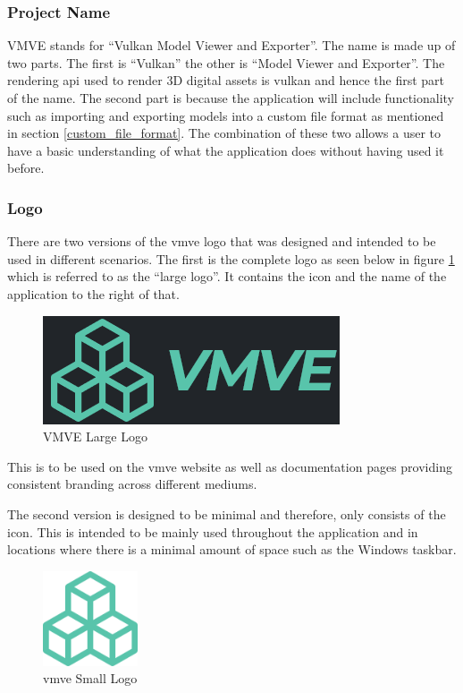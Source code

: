 \documentclass[11pt]{article}
\begin{document}
\subsubsection{Project Name}
VMVE stands for ``Vulkan Model Viewer and Exporter''. The name is made up of
two parts. The first is ``Vulkan'' the other is ``Model Viewer and Exporter''.
The rendering \gls*{api} used to render 3D digital assets is \gls*{vulkan} and
hence the first part of the name. The second part is because the application
will include functionality such as importing and exporting models into a custom
file format as mentioned in section \ref{custom_file_format}. The combination of
these two allows a user to have a basic understanding of what the application
does without having used it before.

\subsubsection{Logo}
There are two versions of the \gls*{vmve} logo that was designed and intended to
be used in different scenarios. The first is the complete logo as seen below in
figure \ref{fig:project_logo_large} which is referred to as the ``large logo''.
It contains the icon and the name of the application to the right of that.
\begin{figure}[H]
  \centering
  \includegraphics[width=\textwidth]{images/project_logo.png}
  \caption{VMVE Large Logo}
  \label{fig:project_logo_large}
\end{figure}
This is to be used on the \gls*{vmve} website as well as documentation pages
providing consistent branding across different mediums.

The second version is designed to be minimal and therefore, only consists of the
icon. This is intended to be mainly used throughout the application and in
locations where there is a minimal amount of space such as the Windows taskbar.
\begin{figure}[H]
  \centering
  \includegraphics[width=0.25\textwidth]{images/project_icon.png}
  \caption{\gls*{vmve} Small Logo}
  \label{fig:project_logo_small}
\end{figure}
\end{document}
